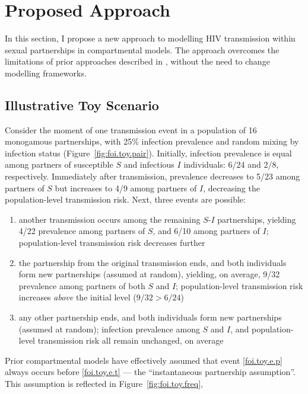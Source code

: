 \section{Proposed Approach}\label{foi.prop}
In this section, I propose a new approach to
modelling HIV transmission within sexual partnerships in compartmental models.
The approach overcomes the limitations of prior approaches described in ,
without the need to change modelling frameworks.
\subsection{Illustrative Toy Scenario}\label{foi.prop.toy}
Consider the moment of one transmission event
in a population of 16 monogamous partnerships, with 25\% infection prevalence
and random mixing by infection status (Figure~\ref{fig:foi.toy.pair}).
Initially, infection prevalence is equal among partners of
susceptible $S$ and infectious $I$ individuals: 6/24 and 2/8, respectively.
Immediately after transmission,
prevalence decreases to 5/23 among partners of $S$ but increases to 4/9 among partners of $I$,
decreasing the population-level transmission risk.
Next, three events are possible:
\begin{enumerate}[label=(\alph*)]
  \item \label{foi.toy.e.t}
  another transmission occurs among the remaining $S$-$I$ partnerships,
  yielding 4/22 prevalence among partners of $S$, and 6/10 among partners of $I$;
  population-level transmission risk decreases further
  \item \label{foi.toy.e.p}
  the partnership from the original transmission ends,
  and both individuals form new partnerships (assumed at random),
  yielding, on average, 9/32 prevalence among partners of both $S$ and $I$;
  population-level transmission risk increases \emph{above} the initial level ($9/32 > 6/24$)
  \item \label{foi.toy.e.q}
  any other partnership ends,
  and both individuals form new partnerships (assumed at random);
  infection prevalence among $S$ and $I$, and population-level transmission risk
  all remain unchanged, on average
\end{enumerate}
Prior compartmental models have effectively assumed that
event \ref{foi.toy.e.p} always occurs before \ref{foi.toy.e.t}
--- \ie the ``instantaneous partnership assumption''.
This assumption is reflected in Figure~\ref{fig:foi.toy.freq},

